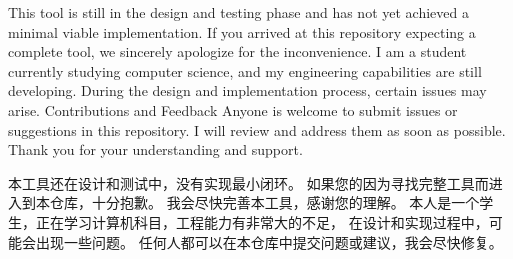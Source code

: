 This tool is still in the design and testing phase and has not yet achieved a minimal viable implementation.
If you arrived at this repository expecting a complete tool, we sincerely apologize for the inconvenience.
I am a student currently studying computer science, and my engineering capabilities are still developing. During the design and implementation process, certain issues may arise.
Contributions and Feedback
Anyone is welcome to submit issues or suggestions in this repository.
I will review and address them as soon as possible.
Thank you for your understanding and support.


本工具还在设计和测试中，没有实现最小闭环。
如果您的因为寻找完整工具而进入到本仓库，十分抱歉。
我会尽快完善本工具，感谢您的理解。
本人是一个学生，正在学习计算机科目，工程能力有非常大的不足，
在设计和实现过程中，可能会出现一些问题。
任何人都可以在本仓库中提交问题或建议，我会尽快修复。    
